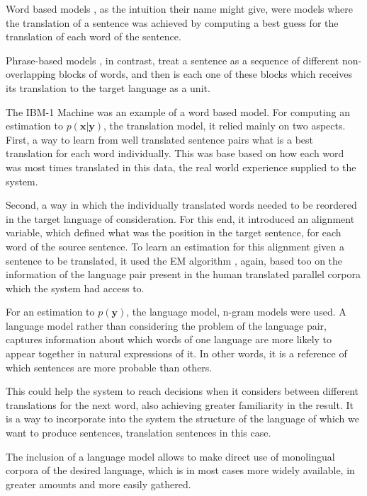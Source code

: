 \documentclass[11pt,english,listoffigures,listoftables]{tfgetsinf}
\newcommand{\vect}[1]{\mathbf{#1}}
\begin{document}
Word based models \cite{brown1990statistical}, as the intuition their name might give, were models where the translation of a sentence was achieved by computing a best guess for the translation of each word of the sentence.

Phrase-based models \cite{koehn2003statistical}, in contrast, treat a sentence as a sequence of different non-overlapping blocks of words, and then is each one of these blocks which receives its translation to the target language as a unit.

The IBM-1 Machine was an example of a word based model.
For computing an estimation to $p(\vect{x}|\vect{y})$, the translation model, it relied mainly on two aspects. First, a way to learn from well translated sentence pairs what is a best translation for each word individually. This was base based on how each word was most times translated in this data, the real world experience supplied to the system.

Second, a way in which the individually translated words needed to be reordered in the target language of consideration. For this end, it introduced an alignment variable, which defined what was the position in the target sentence, for each word of the source sentence. To learn an estimation for this alignment given a sentence to be translated, it used the EM algorithm \cite{DEMP1977}, again, based too on the information of the language pair present in the human translated parallel corpora which the system had access to.

For an estimation to $p(\vect{y})$, the language model, n-gram models \cite{BRODER19971157} were used.
A language model rather than considering the problem of the language pair, captures information about which words of one language are more likely to appear together in natural expressions of it. In other words, it is a reference of which sentences are more probable than others.

This could help the system to reach decisions when it considers between different translations for the next word, also achieving greater familiarity in the result.
It is a way to incorporate into the system the structure of the language of which we want to produce sentences,  translation sentences in this case. 

The inclusion of a language model allows to make direct use of monolingual corpora of the desired language, which is in most cases more widely available, in greater amounts and more easily gathered.
\end{document}
